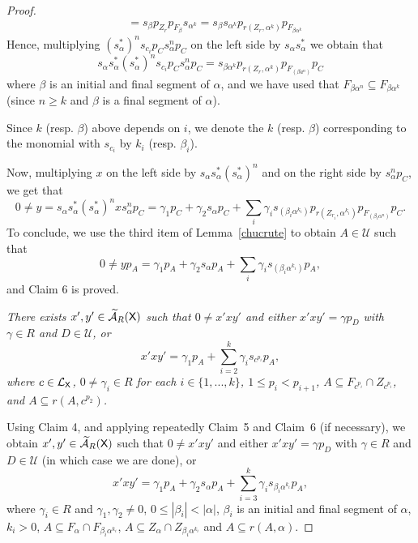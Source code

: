 \documentclass[a4paper,12pt]{amsart}
\theoremstyle{definition}
\theoremstyle{remark}
\numberwithin{equation}{section}
\newcommand{\osf}{{\normalfont \textsf{X}}}
\newcommand{\lang}{\CL_{\osf}}
\newcommand{\ualgshift}{\TCA_R(\osf)}
\newcommand{\CA}{\mathcal{A}}
\newcommand{\CL}{\mathcal{L}}
\newcommand{\TCA}{\widetilde{\CA}}
\newcommand{\TCB}{\mathcal{U}}
\begin{document}
\begin{proof}
\begin{align*}
&=s_\beta p_{Z_r} p_{F_{\beta}} s_{\alpha^k}=s_\beta s_{\alpha^k}p_{r(Z_r,\alpha^k)}p_{F_{\beta\alpha^k}}
\end{align*}
Hence, multiplying $(s_\alpha^*)^ns_{c_i}p_Cs_\alpha^n p_C$ on the left side by $s_\alpha s_\alpha^*$ we obtain that
$$s_\alpha s_\alpha^*(s_\alpha^*)^ns_{c_i}p_Cs_\alpha^n p_C= s_{\beta\alpha^k}p_{r(Z_r,\alpha^k)}p_{F_{(\beta a^n)}}p_C$$ where $\beta$ is an initial and final segment of $\alpha$, and we have used that $F_{\beta \alpha^n}\subseteq F_{\beta \alpha^k}$ (since $n\geq k$ and $\beta$ is a final segment of $\alpha$). 

Since $k$ (resp. $\beta$) above depends on $i$, we denote the $k$ (resp. $\beta$) corresponding to the monomial with $s_{c_i}$ by $k_i$ (resp. $\beta_i$).

Now, multiplying $x$ on the left side by $s_\alpha s_\alpha^* (s_\alpha^*)^n$ and on the right side by $s_\alpha^n p_C$, we get that
$$0\neq y= s_\alpha s_\alpha^* (s_\alpha^*)^n x s_\alpha^n p_C=\gamma_1 p_C+\gamma_2s_\alpha p_C+\sum\limits_i \gamma_i s_{(\beta_i \alpha^{k_i})}p_{r(Z_{r_i}, \alpha^{k_i})}p_{F_{(\beta_i \alpha^n)}}p_C.$$
To conclude, we use the third item of Lemma~\ref{chucrute} to obtain $A\in \TCB$ such that 
$$0\neq y p_A=\gamma_1 p_A+\gamma_2 s_\alpha p_A+ \sum\limits_i \gamma_i s_{(\beta_i \alpha^{k_i})}p_A,$$ and Claim 6 is proved. 




\smallskip
{}
{\it There exists $x',y'\in \ualgshift$ such that $0\neq x'xy'$ and either $x'xy'=\gamma p_D$ with $\gamma \in R$ and $D\in \TCB$, or 
$$x'xy'=\gamma_1 p_A +\sum\limits_{i=2}^k \gamma_i s_{c^{p_i}}p_A,$$
where $c\in \lang$,  $0\neq \gamma_i\in R$ for each $i\in \{1,...,k\}$, $1\leq p_i <p_{i+1}$, $A\subseteq F_{c^{p_i}}\cap Z_{c^{p_i}}$, and  $A\subseteq r(A,c^{p_2})$.}  
\smallskip

Using Claim 4, and applying repeatedly Claim~5 and Claim~6 (if necessary), we obtain $x',y'\in \ualgshift$ such that $0\neq x'xy'$ and either $x'xy'=\gamma p_D$ with $\gamma \in R$ and $D\in \TCB$ (in which case we are done), or  
$$x'xy'=\gamma_1 p_A +\gamma_2 s_\alpha p_A +\sum\limits_{i=3}^k \gamma_i s_{\beta_i \alpha^{k_i}}p_A,$$ where $\gamma_i\in R$ and $\gamma_1, \gamma_2\neq 0$, $0\leq |\beta_i|<|\alpha|$, $\beta_i$ is an initial and final segment of $\alpha$, $k_i> 0$, $A\subseteq F_{\alpha}\cap  F_{\beta_i\alpha^{k_i}}$, $A\subseteq Z_{\alpha}\cap Z_{\beta_i\alpha^{k_i}}$  and  $A\subseteq r(A,\alpha)$.


\end{proof}
\end{document}
